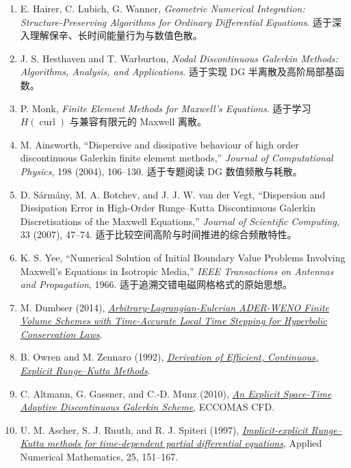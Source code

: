 \documentclass[UTF8,11pt,openany]{ctexbook}
\numberwithin{equation}{chapter}
\theoremstyle{definition}
\theoremstyle{remark}
\newcommand{\curl}{\operatorname{curl}}
\begin{document}
\begin{enumerate}
\item E. Hairer, C. Lubich, G. Wanner, \emph{Geometric Numerical Integration: Structure-Preserving Algorithms for Ordinary Differential Equations}. 适于深入理解保辛、长时间能量行为与数值色散。
\item J. S. Hesthaven and T. Warburton, \emph{Nodal Discontinuous Galerkin Methods: Algorithms, Analysis, and Applications}. 适于实现 DG 半离散及高阶局部基函数。
\item P. Monk, \emph{Finite Element Methods for Maxwell's Equations}. 适于学习 $H(\curl)$ 与兼容有限元的 Maxwell 离散。
\item M. Ainsworth, ``Dispersive and dissipative behaviour of high order discontinuous Galerkin finite element methods,'' \emph{Journal of Computational Physics}, 198 (2004), 106--130. 适于专题阅读 DG 数值频散与耗散。
\item D. S\'arm\'any, M. A. Botchev, and J. J. W. van der Vegt, ``Dispersion and Dissipation Error in High-Order Runge--Kutta Discontinuous Galerkin Discretisations of the Maxwell Equations,'' \emph{Journal of Scientific Computing}, 33 (2007), 47--74. 适于比较空间高阶与时间推进的综合频散特性。
\item K. S. Yee, ``Numerical Solution of Initial Boundary Value Problems Involving Maxwell's Equations in Isotropic Media,'' \emph{IEEE Transactions on Antennas and Propagation}, 1966. 适于追溯交错电磁网格格式的原始思想。
\item M. Dumbser (2014), \href{https://doi.org/10.1016/j.cma.2014.07.019}{\emph{Arbitrary-Lagrangian-Eulerian ADER-WENO Finite Volume Schemes with Time-Accurate Local Time Stepping for Hyperbolic Conservation Laws}}.
\item B. Owren and M. Zennaro (1992), \href{https://doi.org/10.1137/0913084}{\emph{Derivation of Efficient, Continuous, Explicit Runge--Kutta Methods}}.
\item C. Altmann, G. Gassner, and C.-D. Munz (2010), \href{https://congress2.cimne.com/eccomas/proceedings/cfd2010/papers/01008.pdf}{\emph{An Explicit Space-Time Adaptive Discontinuous Galerkin Scheme}}, ECCOMAS CFD.
\item U. M. Ascher, S. J. Ruuth, and R. J. Spiteri (1997), \href{https://doi.org/10.1016/S0168-9274(97)00056-1}{\emph{Implicit-explicit Runge--Kutta methods for time-dependent partial differential equations}}, Applied Numerical Mathematics, 25, 151--167.
\end{enumerate}
\end{document}
